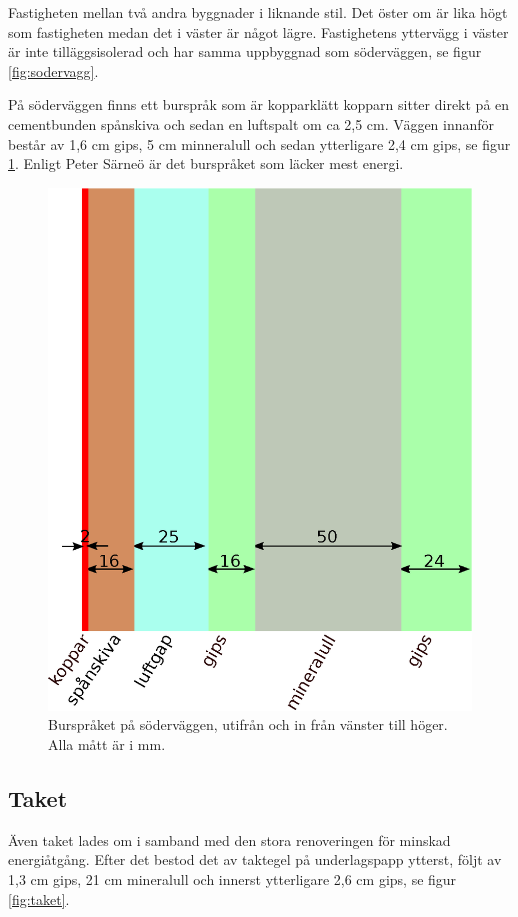 Fastigheten mellan två andra byggnader i liknande stil. Det öster om är lika högt som fastigheten medan det i väster är något lägre. Fastighetens yttervägg i väster är inte tilläggsisolerad och har samma uppbyggnad som söderväggen, se figur \ref{fig:sodervagg}.

På söderväggen finns ett burspråk som är kopparklätt kopparn sitter direkt på en cementbunden spånskiva och sedan en luftspalt om ca 2,5 cm. Väggen innanför består av 1,6 cm gips, 5 cm minneralull och sedan ytterligare 2,4 cm gips, se figur \ref{fig:bursprak}.\cite{kandidatarbete2010} Enligt Peter Särneö\cite{petersarneo} är det burspråket som läcker mest energi.

\begin{figure}[hpbt]
\centering
\includegraphics[width=0.3\textheight]{images/bursprak.eps}
\caption{\label{fig:bursprak}{Burspråket på söderväggen, utifrån och in från vänster till höger. Alla mått är i mm.}}
\end{figure}

\subsection{Taket}
Även taket lades om i samband med den stora renoveringen för minskad energiåtgång. Efter det bestod det av taktegel på underlagspapp ytterst, följt av 1,3 cm gips, 21 cm mineralull och innerst ytterligare 2,6 cm gips, se figur \ref{fig:taket}.\cite{kandidatarbete2010}

